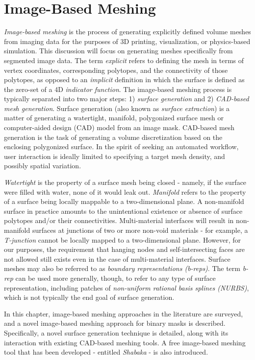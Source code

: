 \chapter{Image-Based Meshing}
\label{chap:3}

\textit{Image-based meshing} is the process of generating explicitly defined volume meshes from imaging data for the purposes of 3D printing, visualization, or physics-based simulation. This discussion will focus on generating meshes specifically from segmented image data. The term \textit{explicit} refers to defining the mesh in terms of vertex coordinates, corresponding polytopes, and the connectivity of those polytopes, as opposed to an \textit{implicit} definition in which the surface is defined as the zero-set of a 4D \textit{indicator function}. The image-based meshing process is typically separated into two major steps: 1) \textit{surface generation} and 2) \textit{CAD-based mesh generation}. Surface generation (also known as \textit{surface extraction}) is a matter of generating a watertight, manifold, polygonized surface mesh or computer-aided design (CAD) model from an image mask. CAD-based mesh generation is the task of generating a volume discretization based on the enclosing polygonized surface. In the spirit of seeking an automated workflow, user interaction is ideally limited to specifying a target mesh density, and possibly spatial variation.

\textit{Watertight} is the property of a surface mesh being closed - namely, if the surface were filled with water, none of it would leak out. \textit{Manifold} refers to the property of a surface being locally mappable to a two-dimensional plane. A non-manifold surface in practice amounts to the unintentional existence or absence of surface polytopes and/or their connectivities. Multi-material interfaces will result in non-manifold surfaces at junctions of two or more non-void materials - for example, a \textit{T-junction} cannot be locally mapped to a two-dimensional plane. However, for our purposes, the requirement that hanging nodes and self-intersecting faces are not allowed still exists even in the case of multi-material interfaces. Surface meshes may also be referred to as \textit{boundary representations (b-reps)}. The term \textit{b-rep} can be used more generally, though, to refer to any type of surface representation, including patches of \textit{non-uniform rational basis splines (NURBS)}, which is not typically the end goal of surface generation. 

In this chapter, image-based meshing approaches in the literature are surveyed, and a novel image-based meshing approach for binary masks is described. Specifically, a novel surface generation technique is detailed, along with its interaction with existing CAD-based meshing tools. A free image-based meshing tool that has been developed - entitled \textit{Shabaka} - is also introduced.

